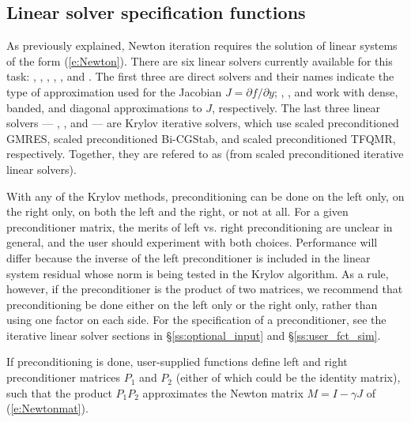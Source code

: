 \subsection{Linear solver specification functions}\label{sss:lin_solv_init}

As previously explained, Newton iteration requires the solution of
linear systems of the form (\ref{e:Newton}).  There are six {\cvode} linear
solvers currently available for this task: {\cvdense}, {\cvband}, {\cvdiag},
{\cvspgmr}, {\cvspbcg}, and {\cvsptfqmr}.  The first three are direct solvers
and their names indicate the type of approximation used for the Jacobian 
$J = \partial{f}/\partial{y}$; {\cvdense}, {\cvband}, and {\cvdiag} work with
dense, banded, and diagonal approximations to $J$, respectively.  The last
three {\cvode} linear solvers --- {\cvspgmr}, {\cvspbcg}, and {\cvsptfqmr} ---
are Krylov iterative solvers, which use scaled preconditioned GMRES, scaled
preconditioned Bi-CGStab, and scaled preconditioned TFQMR, respectively.
Together, they are refered to as {\cvspils} (from scaled preconditioned 
iterative linear solvers).

With any of the Krylov methods, preconditioning 
can be done on the left only, on the right only, on both the left and the right, 
or not at all.  For a given preconditioner matrix, the merits of left vs. right
preconditioning are unclear in general, and the user should experiment
with both choices.  Performance will differ because the inverse of the
left preconditioner is included in the linear system residual whose
norm is being tested in the Krylov algorithm.  As a rule, however, if
the preconditioner is the product of two matrices, we recommend that
preconditioning be done either on the left only or the right only,
rather than using one factor on each side. For the specification of a
preconditioner, see the iterative linear solver sections in \S\ref{ss:optional_input} 
and \S\ref{ss:user_fct_sim}.

If preconditioning is done, user-supplied functions define left and right 
preconditioner matrices $P_1$ and $P_2$ (either of which could be the identity
matrix), such that the product $P_1 P_2$ approximates the Newton matrix
$M = I - \gamma J$ of (\ref{e:Newtonmat}).

